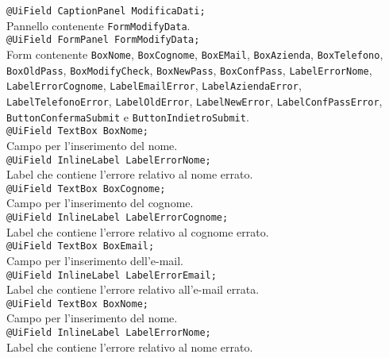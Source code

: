 {\begin{sloppypar}
{{\begin{itemize}
				\texttt{@UiField CaptionPanel ModificaDati;}\\
				Pannello contenente \texttt{FormModifyData}.\\

				\texttt{@UiField FormPanel FormModifyData;}\\
				Form contenente \texttt{BoxNome}, \texttt{BoxCognome}, \texttt{BoxEMail}, \texttt{BoxAzienda}, \texttt{BoxTelefono}, \texttt{BoxOldPass}, \texttt{BoxModifyCheck}, \texttt{BoxNewPass}, \texttt{BoxConfPass}, \texttt{LabelErrorNome}, \texttt{LabelErrorCognome}, \texttt{LabelEmailError}, \texttt{LabelAziendaError}, \texttt{LabelTelefonoError}, \texttt{LabelOldError}, \texttt{LabelNewError}, \texttt{LabelConfPassError}, \texttt{ButtonConfermaSubmit} e \texttt{ButtonIndietroSubmit}.\\

				\texttt{@UiField TextBox BoxNome;}\\
				Campo per l'inserimento del nome.\\

				\texttt{@UiField InlineLabel LabelErrorNome;}\\
				Label che contiene l'errore relativo al nome errato.\\
				
				\texttt{@UiField TextBox BoxCognome;}\\
				Campo per l'inserimento del cognome.\\

				\texttt{@UiField InlineLabel LabelErrorCognome;}\\
				Label che contiene l'errore relativo al cognome errato.\\
				
				\texttt{@UiField TextBox BoxEmail;}\\
				Campo per l'inserimento dell'e-mail.\\

				\texttt{@UiField InlineLabel LabelErrorEmail;}\\
				Label che contiene l'errore relativo all'e-mail errata.\\
				
				\texttt{@UiField TextBox BoxNome;}\\
				Campo per l'inserimento del nome.\\

				\texttt{@UiField InlineLabel LabelErrorNome;}\\
				Label che contiene l'errore relativo al nome errato.\\
				

\end{itemize}}}
\end{sloppypar}}

